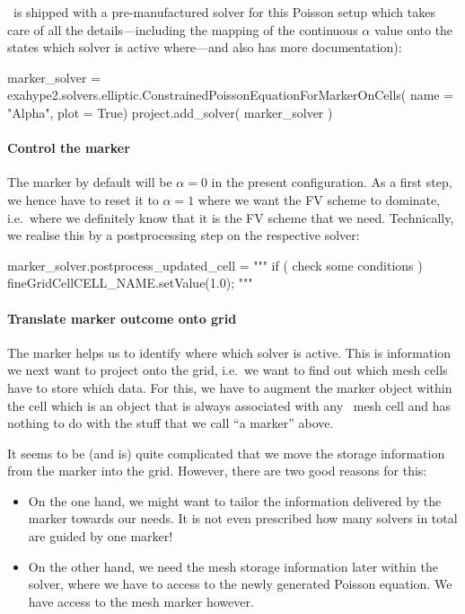\ExaHyPE\ is shipped with a pre-manufactured solver for this Poisson setup 
which takes care of all the details---including the mapping of the continuous
$\alpha $ value onto the states which solver is active where---and also has more
documentation):


\begin{code}
marker_solver = exahype2.solvers.elliptic.ConstrainedPoissonEquationForMarkerOnCells( name = "Alpha",
                                                                             plot = True) 
project.add_solver( marker_solver )
\end{code}


\paragraph*{Control the marker}

The marker by default will be $\alpha =0$ in the present configuration. 
As a first step, we hence have to reset it to $\alpha =1$ where we want the FV
scheme to dominate, i.e.~where we definitely know that it is the FV scheme that
we need.
Technically, we realise this by a postprocessing step on the respective solver:

\begin{code}
 marker_solver.postprocess_updated_cell = """
if ( check some conditions ) {
  fineGridCell{{CELL_NAME}}.setValue(1.0);
}
"""
\end{code}


\paragraph*{Translate marker outcome onto grid}

The marker helps us to identify where which solver is active. 
This is information we next want to project onto the grid, i.e.~we want to find
out which mesh cells have to store which data.
For this, we have to augment the marker object within the cell which is an
object that is always associated with any \Peano\ mesh cell and has nothing to
do with the stuff that we call ``a marker'' above.

\begin{remark}
 It seems to be (and is) quite complicated that we move the storage information
 from the marker into the grid. 
 However, there are two good reasons for this:
 \begin{itemize}
   \item On the one hand, we might want to tailor the information delivered by
   the marker towards our needs. It is not even prescribed how many solvers in
   total are guided by one marker!
   \item On the other hand, we need the mesh storage information later within
   the solver, where we have to access to the newly generated Poisson equation.
   We have access to the mesh marker however.
 \end{itemize}
\end{remark}


